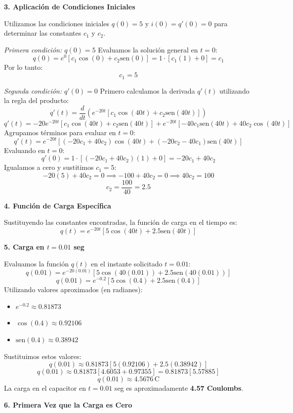 \documentclass[a4paper]{article}
\begin{document}
\textbf{3. Aplicación de Condiciones Iniciales}

Utilizamos las condiciones iniciales $q(0) = 5$ y $i(0) = q'(0) = 0$ para determinar las constantes $c_1$ y $c_2$.

\textit{Primera condición: $q(0) = 5$}
Evaluamos la solución general en $t = 0$:
$$
q(0) = e^{0} [c_1 \cos(0) + c_2 \text{sen}(0)] = 1 \cdot [c_1(1) + 0] = c_1
$$
Por lo tanto:
$$
c_1 = 5
$$

\textit{Segunda condición: $q'(0) = 0$}
Primero calculamos la derivada $q'(t)$ utilizando la regla del producto:
$$
q'(t) = \frac{d}{dt} \left( e^{-20t} [c_1 \cos(40t) + c_2 \text{sen}(40t)] \right)
$$
$$
q'(t) = -20 e^{-20t} [c_1 \cos(40t) + c_2 \text{sen}(40t)] + e^{-20t} [-40 c_1 \text{sen}(40t) + 40 c_2 \cos(40t)]
$$
Agrupamos términos para evaluar en $t=0$:
$$
q'(t) = e^{-20t} [ (-20c_1 + 40c_2) \cos(40t) + (-20c_2 - 40c_1) \text{sen}(40t) ]
$$
Evaluando en $t = 0$:
$$
q'(0) = 1 \cdot [ (-20c_1 + 40c_2)(1) + 0 ] = -20c_1 + 40c_2
$$
Igualamos a cero y sustitimos $c_1 = 5$:
$$
-20(5) + 40c_2 = 0 \implies -100 + 40c_2 = 0 \implies 40c_2 = 100
$$
$$
c_2 = \frac{100}{40} = 2.5
$$

\textbf{4. Función de Carga Específica}

Sustituyendo las constantes encontradas, la función de carga en el tiempo es:
$$
q(t) = e^{-20t} [5 \cos(40t) + 2.5 \text{sen}(40t)]
$$

\textbf{5. Carga en $t = 0.01$ seg}

Evaluamos la función $q(t)$ en el instante solicitado $t = 0.01$:
$$
q(0.01) = e^{-20(0.01)} [5 \cos(40(0.01)) + 2.5 \text{sen}(40(0.01))]
$$
$$
q(0.01) = e^{-0.2} [5 \cos(0.4) + 2.5 \text{sen}(0.4)]
$$
Utilizando valores aproximados (en radianes):
\begin{itemize}
    \item $e^{-0.2} \approx 0.81873$
    \item $\cos(0.4) \approx 0.92106$
    \item $\text{sen}(0.4) \approx 0.38942$
\end{itemize}
Sustituimos estos valores:
$$
q(0.01) \approx 0.81873 [5(0.92106) + 2.5(0.38942)]
$$
$$
q(0.01) \approx 0.81873 [4.6053 + 0.97355] = 0.81873 [5.57885]
$$
$$
q(0.01) \approx 4.5676 \, \text{C}
$$
La carga en el capacitor en $t=0.01$ seg es aproximadamente \textbf{4.57 Coulombs}.

\textbf{6. Primera Vez que la Carga es Cero}
\end{document}
